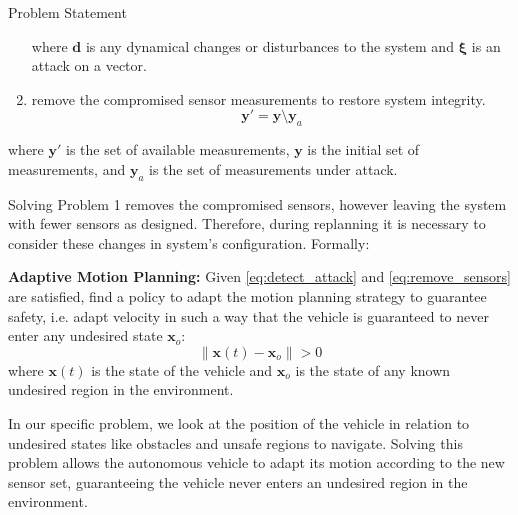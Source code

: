 \begin{section}{Problem Statement}
\begin{problem}
\begin{enumerate}
\begin{equation}
	\end{equation}
where $\bm{d}$ is any dynamical changes or disturbances to the system and $\bm{\xi}$ is an attack on a vector.
	\item remove the compromised sensor measurements to restore system integrity.
	 \vspace{-5pt}
	\begin{equation}
	\label{eq:remove_sensors}
	    \bm{y}'=\bm{y} \setminus \bm{y}_a
	\end{equation}
\end{enumerate}
where $\bm{y}'$ is the set of available measurements, $\bm{y}$ is the initial set of measurements, and $\bm{y}_a$ is the set of measurements under attack.


\end{problem}

Solving Problem 1 removes the compromised sensors, however leaving the system with fewer sensors as designed. Therefore, during replanning it is necessary to consider these changes in system's configuration. Formally:
	
\begin{problem} \label{problem2} {\textbf{Adaptive Motion Planning:}}
Given \eqref{eq:detect_attack} and \eqref{eq:remove_sensors} are satisfied, find a policy to adapt the motion planning strategy to guarantee safety, i.e. adapt velocity in such a way that the vehicle is guaranteed to never enter any undesired state $\bm{x}_o$:  
	\begin{equation}
		\lVert {\bm{x}(t)-\bm{x}_o} \rVert > 0
	\end{equation}
where $\bm{x}(t)$ is the state of the vehicle and $\bm{x}_o$ is the state of any known undesired region in the environment.
	\end{problem}

In our specific problem, we look at the position of the vehicle in relation to undesired states like obstacles and unsafe regions to navigate. Solving this problem allows the autonomous vehicle to adapt its motion according to the new sensor set, guaranteeing the vehicle never enters an undesired region in the environment.
\end{section}